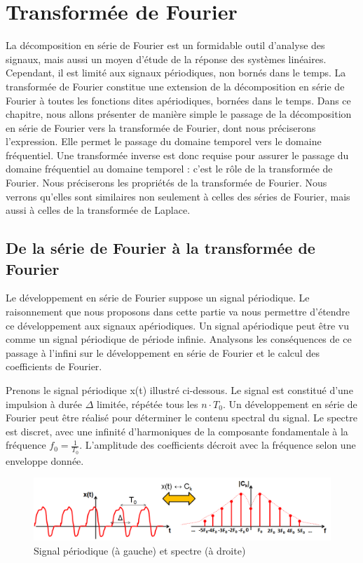 \chapter{Transformée de Fourier}
\label{chap:transformee}
	La décomposition en série de Fourier est un formidable outil d'analyse des signaux, mais aussi un moyen d'étude de la réponse des systèmes linéaires. Cependant, il est limité aux signaux périodiques, non bornés dans le temps. La transformée de Fourier constitue une extension de la décomposition en série de Fourier à toutes les fonctions dites apériodiques, bornées dans le temps. Dans ce chapitre, nous allons présenter de manière simple le passage de la décomposition en série de Fourier vers la transformée de Fourier, dont nous préciserons l'expression. Elle permet le passage du domaine temporel vers le domaine fréquentiel. Une transformée inverse est donc requise pour assurer le passage du domaine fréquentiel au domaine temporel : c'est le rôle de la transformée de Fourier.
	Nous préciserons les propriétés de la transformée de Fourier. Nous verrons qu'elles sont similaires non seulement à celles des séries de Fourier, mais aussi à celles de la transformée de Laplace. 
	
	\section{De la série de Fourier à la transformée de Fourier}
	Le développement en série de Fourier suppose un signal périodique. Le raisonnement que nous proposons dans cette partie va nous permettre d'étendre ce développement aux signaux apériodiques. Un signal apériodique peut être vu comme un signal périodique de période infinie. Analysons les conséquences de ce passage à l'infini sur le développement en série de Fourier et le calcul des coefficients de Fourier.
	
	Prenons le signal périodique x(t) illustré ci-dessous. Le signal est constitué d'une impulsion à durée $\Delta$ limitée, répétée tous les $n\cdot T_0$. Un développement en série de Fourier peut être réalisé pour déterminer le contenu spectral du signal. Le spectre est discret, avec une infinité d'harmoniques de la composante fondamentale à la fréquence $f_0=\frac{1}{T_0}$. L'amplitude des coefficients décroit avec la fréquence selon une enveloppe donnée.
	
	\begin{figure}[h!]
		\centering
		\includegraphics[scale=0.5]{images/Serie_To_Transfo_Fourier_1.png}
		\caption{Signal périodique (à gauche) et spectre (à droite)}	
		\label{Fig:Serie_To_Transfo_Fourier_1} 
	\end{figure}

